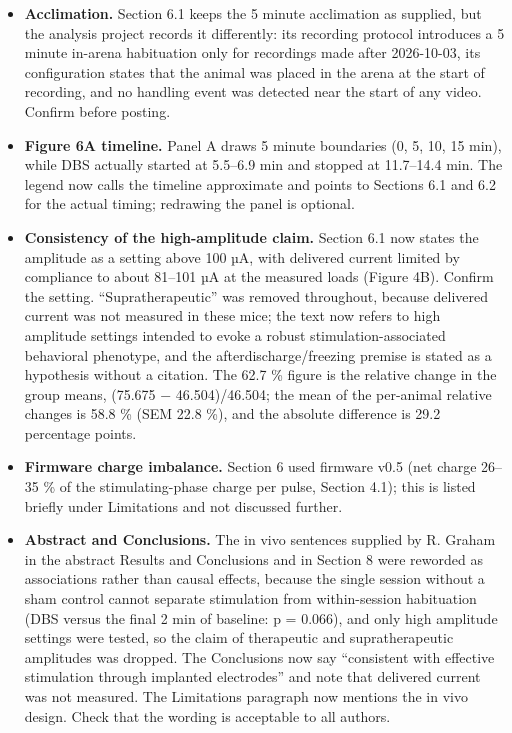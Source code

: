 \begin{itemize}
\item \textbf{Acclimation.} Section 6.1 keeps the 5 minute acclimation as supplied, but the analysis project records it differently: its recording protocol introduces a 5 minute in-arena habituation only for recordings made after 2026-10-03, its configuration states that the animal was placed in the arena at the start of recording, and no handling event was detected near the start of any video. Confirm before posting.
\item \textbf{Figure 6A timeline.} Panel A draws 5 minute boundaries (0, 5, 10, 15 min), while DBS actually started at 5.5--6.9 min and stopped at 11.7--14.4 min. The legend now calls the timeline approximate and points to Sections 6.1 and 6.2 for the actual timing; redrawing the panel is optional.
\item \textbf{Consistency of the high-amplitude claim.} Section 6.1 now states the amplitude as a setting above 100 µA, with delivered current limited by compliance to about 81--101 µA at the measured loads (Figure 4B). Confirm the setting. ``Supratherapeutic'' was removed throughout, because delivered current was not measured in these mice; the text now refers to high amplitude settings intended to evoke a robust stimulation-associated behavioral phenotype, and the afterdischarge/freezing premise is stated as a hypothesis without a citation. The 62.7 \% figure is the relative change in the group means, (75.675 − 46.504)/46.504; the mean of the per-animal relative changes is 58.8 \% (SEM 22.8 \%), and the absolute difference is 29.2 percentage points.
\item \textbf{Firmware charge imbalance.} Section 6 used firmware v0.5 (net charge 26--35 \% of the stimulating-phase charge per pulse, Section 4.1); this is listed briefly under Limitations and not discussed further.
\item \textbf{Abstract and Conclusions.} The in vivo sentences supplied by R. Graham in the abstract Results and Conclusions and in Section 8 were reworded as associations rather than causal effects, because the single session without a sham control cannot separate stimulation from within-session habituation (DBS versus the final 2 min of baseline: p = 0.066), and only high amplitude settings were tested, so the claim of therapeutic and supratherapeutic amplitudes was dropped. The Conclusions now say ``consistent with effective stimulation through implanted electrodes'' and note that delivered current was not measured. The Limitations paragraph now mentions the in vivo design. Check that the wording is acceptable to all authors.
\end{itemize}

